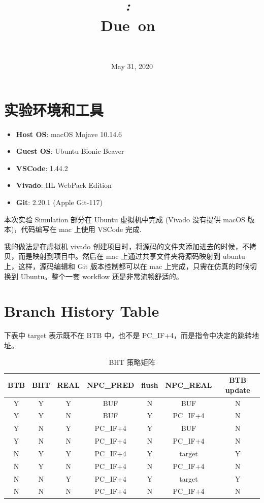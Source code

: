 \documentclass{article}
\title{
  \vspace{2in}
  \textbf{\reportMainTitle}\\
  \vspace{0.2in}
  \Large\textit{\reportClass:\ \reportTitle}\\
  \vspace{0.1in}
  \normalsize\vspace{0.1in}\small{Due\ on\ \reportDueTime}\\
  \vspace{3in}
}
\author{\reportAuthorName \\ \reportStudentNo}
\date{May 31, 2020}
\begin{document}
\maketitle

\pagebreak

\tableofcontents\label{toc}

\pagebreak

\newpage

\section{实验环境和工具}
\begin{itemize}
  \item
    \textbf{Host OS}: macOS Mojave 10.14.6
  \item
    \textbf{Guest OS}: Ubuntu Bionic Beaver
  \item
    \textbf{VSCode}: 1.44.2
  \item
    \textbf{Vivado}: HL WebPack Edition
  \item
    \textbf{Git}: 2.20.1 (Apple Git-117)
\end{itemize}
本次实验 Simulation 部分在 Ubuntu 虚拟机中完成 (Vivado 没有提供 macOS 版本)，代码编写在 mac 上使用 VSCode 完成.

我的做法是在虚拟机 vivado 创建项目时，将源码的文件夹添加进去的时候，不拷贝，而是映射到项目中。然后在 mac 上通过共享文件夹将源码映射到 ubuntu 上，这样，源码编辑和 Git 版本控制都可以在 mac 上完成，只需在仿真的时候切换到 Ubuntu。整个一套 workflow 还是非常流畅舒适的。

\section{Branch History Table}
下表中 target 表示既不在 BTB 中，也不是 PC\_IF+4，而是指令中决定的跳转地址。
\begin{table}[H]
  \centering
  \begin{tabular}{c c c c c c c}
    \toprule
    BTB & BHT & REAL & NPC\_PRED & flush & NPC\_REAL & BTB update \\
    \midrule
    Y   & Y   & Y    & BUF       & N     & BUF       & N          \\
    Y   & Y   & N    & BUF       & Y     & PC\_IF+4  & N          \\
    Y   & N   & Y    & PC\_IF+4  & Y     & BUF       & N          \\
    Y   & N   & N    & PC\_IF+4  & N     & PC\_IF+4  & N          \\
    N   & Y   & Y    & PC\_IF+4  & Y     & target    & Y          \\
    N   & Y   & N    & PC\_IF+4  & N     & PC\_IF+4  & N          \\
    N   & N   & Y    & PC\_IF+4  & Y     & target    & Y          \\
    N   & N   & N    & PC\_IF+4  & N     & PC\_IF+4  & N          \\
    \bottomrule
  \end{tabular}
  \caption{BHT 策略矩阵}
\end{table}
\end{document}
